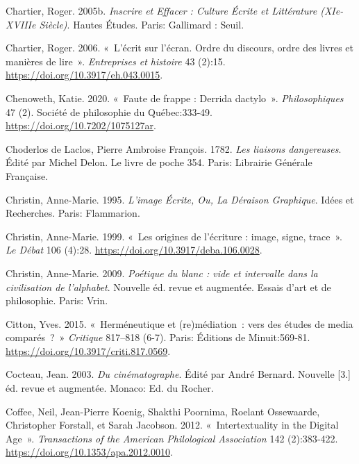 \begin{CSLReferences}{1}{0}
\leavevmode{}%
Chartier, Roger. 2005b. \emph{Inscrire et Effacer : Culture {É}crite et
Litt{é}rature ({XIe-XVIIIe} Si{è}cle)}. Hautes {É}tudes. {Paris}:
{Gallimard : Seuil}.

\leavevmode{}%
Chartier, Roger. 2006. {«~{L'{é}crit sur l'{é}cran. Ordre du discours,
ordre des livres et mani{è}res de lire}~»}. \emph{Entreprises et
histoire} 43 (2):15. \url{https://doi.org/10.3917/eh.043.0015}.

\leavevmode{}%
Chenoweth, Katie. 2020. {«~{Faute de frappe : Derrida dactylo}~»}.
\emph{Philosophiques} 47 (2). {Soci{é}t{é} de philosophie du
Qu{é}bec}:333‑49. \url{https://doi.org/10.7202/1075127ar}.

\leavevmode{}%
Choderlos de Laclos, Pierre Ambroise François. 1782. \emph{{Les liaisons
dangereuses}}. Édité par Michel Delon. {Le livre de poche} 354. {Paris}:
{Librairie G{é}n{é}rale Fran{ç}aise}.

\leavevmode{}%
Christin, Anne-Marie. 1995. \emph{L'image {É}crite, Ou, {La} D{é}raison
Graphique}. Id{é}es et Recherches. {Paris}: {Flammarion}.

\leavevmode{}%
Christin, Anne-Marie. 1999. {«~{Les origines de l'{é}criture : image,
signe, trace}~»}. \emph{Le D{é}bat} 106 (4):28.
\url{https://doi.org/10.3917/deba.106.0028}.

\leavevmode{}%
Christin, Anne-Marie. 2009. \emph{{Po{é}tique du blanc : vide et
intervalle dans la civilisation de l'alphabet}}. Nouvelle {é}d. revue et
augment{é}e. {Essais d'art et de philosophie}. {Paris}: {Vrin}.

\leavevmode{}%
Citton, Yves. 2015. {«~{Herm{é}neutique et (re)m{é}diation~: vers des
{é}tudes de media compar{é}s~?}~»} \emph{Critique} 817--818 (6-7).
{Paris}: {{É}ditions de Minuit}:569‑81.
\url{https://doi.org/10.3917/criti.817.0569}.

\leavevmode{}%
Cocteau, Jean. 2003. \emph{{Du cin{é}matographe}}. Édité par André
Bernard. Nouvelle {[}3.{]} {é}d. revue et augment{é}e. {Monaco}: {Ed. du
Rocher}.

\leavevmode{}%
Coffee, Neil, Jean-Pierre Koenig, Shakthi Poornima, Roelant Ossewaarde,
Christopher Forstall, et Sarah Jacobson. 2012. {«~Intertextuality in the
{Digital Age}~»}. \emph{Transactions of the American Philological
Association} 142 (2):383‑422.
\url{https://doi.org/10.1353/apa.2012.0010}.


\end{CSLReferences}
